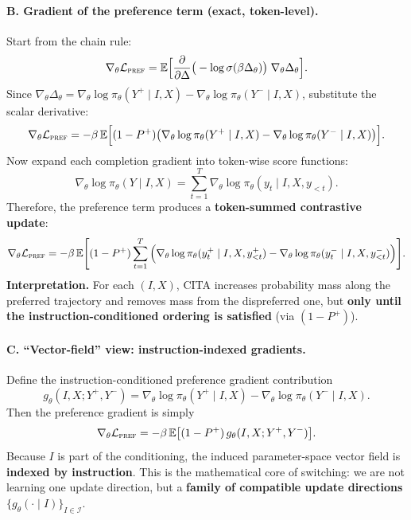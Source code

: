 \vspace{-0.35em}
\paragraph{\textbf{B. Gradient of the preference term (exact, token-level).}}
Start from the chain rule:
\[
\nabla_\theta \mathcal{L}_{\textsc{pref}}
=
\mathbb{E}
\Big[
\frac{\partial}{\partial \Delta}\big(-\log \sigma(\beta\Delta_\theta)\big)\;
\nabla_\theta \Delta_\theta
\Big].
\]
Since $\nabla_\theta \Delta_\theta=\nabla_\theta\log\pi_\theta(Y^+\mid I,X)-\nabla_\theta\log\pi_\theta(Y^-\mid I,X)$, substitute the scalar derivative:
\[
\nabla_\theta \mathcal{L}_{\textsc{pref}}
=
-\beta\,
\mathbb{E}
\Big[
(1-P^+)\big(
\nabla_\theta\log\pi_\theta(Y^+\mid I,X)-\nabla_\theta\log\pi_\theta(Y^-\mid I,X)
\big)
\Big].
\]
Now expand each completion gradient into token-wise score functions:
\[
\nabla_\theta\log\pi_\theta(Y\mid I,X)
=
\sum_{t=1}^{T}
\nabla_\theta\log\pi_\theta(y_t\mid I,X,y_{<t}).
\]
Therefore, the preference term produces a \textbf{token-summed contrastive update}:
\[
\nabla_\theta \mathcal{L}_{\textsc{pref}}
=
-\beta\,
\mathbb{E}
\Bigg[
(1-P^+)\sum_{t=1}^{T}
\Big(
\nabla_\theta\log\pi_\theta(y^+_t\mid I,X,y^+_{<t})
-
\nabla_\theta\log\pi_\theta(y^-_t\mid I,X,y^-_{<t})
\Big)
\Bigg].
\]
\textbf{Interpretation.} For each $(I,X)$, CITA increases probability mass along the preferred trajectory and removes mass from the dispreferred one, but \textbf{only until the instruction-conditioned ordering is satisfied} (via $(1-P^+)$).

\vspace{-0.35em}
\paragraph{\textbf{C. ``Vector-field'' view: instruction-indexed gradients.}}
Define the instruction-conditioned preference gradient contribution
\[
g_\theta(I,X;Y^+,Y^-)
=
\nabla_\theta\log\pi_\theta(Y^+\mid I,X)-\nabla_\theta\log\pi_\theta(Y^-\mid I,X).
\]
Then the preference gradient is simply
\[
\nabla_\theta \mathcal{L}_{\textsc{pref}}
=
-\beta\,\mathbb{E}\big[(1-P^+)\,g_\theta(I,X;Y^+,Y^-)\big].
\]
Because $I$ is part of the conditioning, the induced parameter-space vector field is \textbf{indexed by instruction}.
This is the mathematical core of switching: we are not learning one update direction, but a \textbf{family of compatible update directions} $\{g_\theta(\cdot\mid I)\}_{I\in\mathcal{I}}$.

\vspace{-0.35em}
